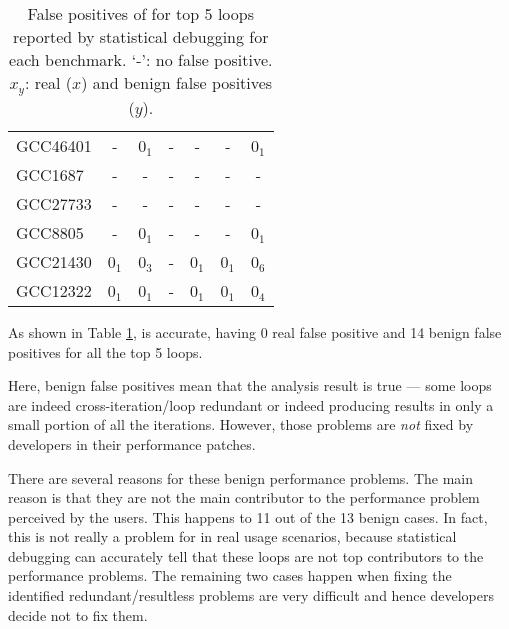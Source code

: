 \begin{table}
\begin{tabular}{lcccccc}
   \midrule
   GCC46401              &   -                  & 0$_1$                       & -                       & -                     &   -             & 0$_1$\\
   GCC1687               &   -                  & -                           & -                       & -                     &   -             & -\\
   GCC27733            &   -                  & -                           & -                       & -                     &   -             & - \\
   GCC8805               &   -                  & 0$_1$                       & -                       & -                     &   -             & 0$_1$\\
   GCC21430              &   0$_1$              & 0$_3$                       & -                       & 0$_1$                 &   0$_1$         & 0$_6$\\
   GCC12322              &   0$_1$              & 0$_1$                       & -                       & 0$_1$                 &   0$_1$         & 0$_4$\\
\bottomrule
   \end{tabular}
\vspace{-0.1in}
  \caption{False positives of \Tool for top 5 loops reported by 
    statistical debugging for each benchmark. `-': no false positive. $x_y$: real ($x$) and benign false positives ($y$).
}
  \label{tab:top5}
\end{table}

As shown in Table \ref{tab:top5}, \Tool is accurate, having 0 real
false positive and 14 benign false positives for all the top 5 loops.

Here, benign false positives mean that the \Tool analysis result is true ---
some loops are indeed cross-iteration/loop redundant or indeed producing
results in only a small portion of all the iterations. However, those
problems are \textit{not} fixed by developers in their performance patches. 

There are several reasons for these benign performance problems. 
The main reason is that they are not the main contributor to the 
performance problem perceived by the users. This happens to 11 out of the
13 benign cases. In fact, this is not really a problem for \Tool in 
real usage scenarios, because statistical debugging can accurately
tell that these loops are not top contributors to the performance
problems.
The remaining two cases happen when fixing the 
identified redundant/resultless problems
are very difficult and hence developers decide not to fix them.

